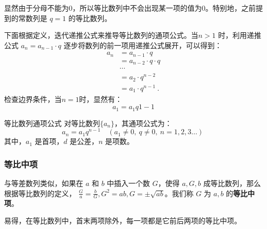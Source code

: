 显然由于分母不能为0，所以等比数列中不会出现某一项的值为0。特别地，之前提到的常数列是 $q = 1$ 的等比数列。


下面根据定义，迭代递推公式来推导等比数列的通项公式。当$n>1$ 时，利用递推公式  $a_n = a_{n-1} \cdot q$ 逐步将数列的前一项用递推公式展开，可以得到：
\begin{equation}
\begin{aligned}
a_n &= a_{n-1} \cdot q\\
&= a_{n-2}\cdot q\cdot q\\
&\cdots \\
&= a_2\cdot q^{n-2}\\
&=  a_1 \cdot q^{n-1}~.
\end{aligned}
\end{equation}
检查边界条件，当$n=1$时，显然有：
\begin{equation}
a_1=a_1q{1-1}
\end{equation}

\begin{corollary}{等比数列通项公式}
对等比数列$\{a_n\}$，其通项公式为：
\begin{equation}
a_n = a_1 q^{n-1} \quad (a_1 \ne 0,\ q\ne 0,\ n=1,2,3\dots)~
\end{equation}
其中，$a_1$ 是首项，$d$ 是公差，$n$ 是项数。

\end{corollary}




\subsubsection{等比中项}
与等差数列类似，如果在 $a$ 和 $b$ 中插入一个数 $G$，使得 $a,G,b$ 成等比数列，那么根据等比数列的定义， $\frac{G}{a} = \frac{b}{G},G^2 = ab,G = \pm \sqrt{ab}$。我们称 $G$ 为 $a,b$ 的\textbf{等比中项}。

易得，在等比数列中，首末两项除外，每一项都是它前后两项的等比中项。

